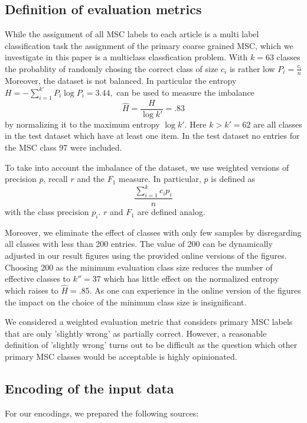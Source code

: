 \subsection{Definition of evaluation metrics}
While the assignment of all MSC labels to each article is a multi label classification task the assignment of the primary coarse grained MSC, which we investigate in this paper is a multiclass classfication problem.
With $k=63$ classes the probablity of randomly chosing the correct class of size $c_i$ is rather low
\(
P_i=\frac{c_i}{n}
\)
Moreover, the dataset is not balanced. In particular the entropy \(
H=-\sum_{i=1}^{k'}P_i\log P_i=3.44,
\)
can be used to measure the imbalance \[
\hat{H}=\frac{H}{\log k'}=.83
\]
by normalizing it to the maximum entropy $\log k'.$
Here $k>k'=62$ are all classes in the test dataset which have at least one item. 
In the test dataset no entries for the MSC class 97 were included.

To take into account the imbalance of the dataset, we use weighted versions of precision $p$, recall $r$ and the $F_1$ measure. In particular, $p$ is defined as \[
\frac{\sum_{i=1}^{k}c_ip_i}{n}
\] with the class precision $p_i$.
$r$ and $F_1$ are defined analog.

Moreover, we eliminate the effect of classes with only few samples by disregarding all classes with less than 200 entries.
The value of 200 can be dynamically adjusted in our result figures using the provided online versions of the figures.
Choosing 200 as the minimum evaluation class size reduces the number of effective classes to $k''=37$ which has little effect on the normalized entropy which raises to $\hat{H}=.85.$
As one can experience in the online version of the figures the impact on the choice of the minimum class size is insignificant.

We considered a weighted evaluation metric that considers primary MSC labels that are only 'slightly wrong' as partially correct.
However, a reasonable definition of 'slightly wrong' turns out to be difficult as the question which other primary MSC classes would be acceptable is highly opinionated.

\subsection{Encoding of the input data}


For our encodings, we prepared the following sources:

